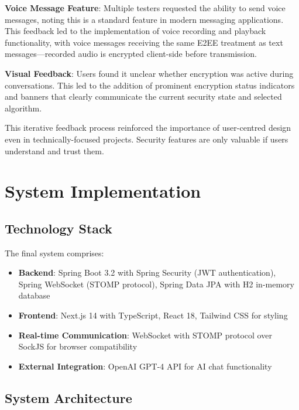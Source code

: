 \documentclass[11pt,a4paper]{article}
\begin{document}
\textbf{Voice Message Feature}: Multiple testers requested the ability to send voice messages, noting this is a standard feature in modern messaging applications. This feedback led to the implementation of voice recording and playback functionality, with voice messages receiving the same E2EE treatment as text messages---recorded audio is encrypted client-side before transmission.

\textbf{Visual Feedback}: Users found it unclear whether encryption was active during conversations. This led to the addition of prominent encryption status indicators and banners that clearly communicate the current security state and selected algorithm.

This iterative feedback process reinforced the importance of user-centred design even in technically-focused projects. Security features are only valuable if users understand and trust them.

\section{System Implementation}

\subsection{Technology Stack}

The final system comprises:
\begin{itemize}
    \item \textbf{Backend}: Spring Boot 3.2 with Spring Security (JWT authentication), Spring WebSocket (STOMP protocol), Spring Data JPA with H2 in-memory database
    \item \textbf{Frontend}: Next.js 14 with TypeScript, React 18, Tailwind CSS for styling
    \item \textbf{Real-time Communication}: WebSocket with STOMP protocol over SockJS for browser compatibility
    \item \textbf{External Integration}: OpenAI GPT-4 API for AI chat functionality
\end{itemize}

\subsection{System Architecture}
\end{document}
